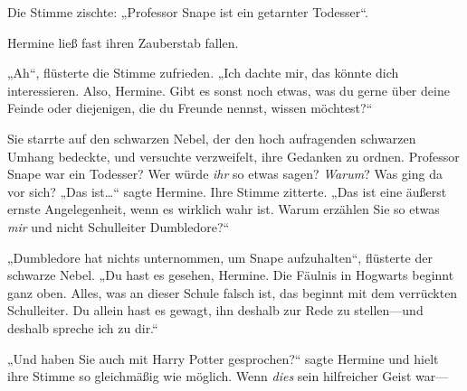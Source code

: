 Die Stimme zischte: „Professor Snape ist ein getarnter Todesser“.

Hermine ließ fast ihren Zauberstab fallen.

„Ah“, flüsterte die Stimme zufrieden. „Ich dachte mir, das könnte dich interessieren. Also, Hermine. Gibt es sonst noch etwas, was du gerne über deine Feinde oder diejenigen, die du Freunde nennst, wissen möchtest?“

Sie starrte auf den schwarzen Nebel, der den hoch aufragenden schwarzen Umhang bedeckte, und versuchte verzweifelt, ihre Gedanken zu ordnen. Professor Snape war ein Todesser? Wer würde \emph{ihr} so etwas sagen? \emph{Warum}? Was ging da vor sich? „Das ist…“ sagte Hermine. Ihre Stimme zitterte. „Das ist eine äußerst ernste Angelegenheit, wenn es wirklich wahr ist. Warum erzählen Sie so etwas \emph{mir} und nicht Schulleiter Dumbledore?“

„Dumbledore hat nichts unternommen, um Snape aufzuhalten“, flüsterte der schwarze Nebel. „Du hast es gesehen, Hermine. Die Fäulnis in Hogwarts beginnt ganz oben. Alles, was an dieser Schule falsch ist, das beginnt mit dem verrückten Schulleiter. Du allein hast es gewagt, ihn deshalb zur Rede zu stellen—und deshalb spreche ich zu dir.“

„Und haben Sie auch mit Harry Potter gesprochen?“ sagte Hermine und hielt ihre Stimme so gleichmäßig wie möglich. Wenn \emph{dies} sein hilfreicher Geist war—

